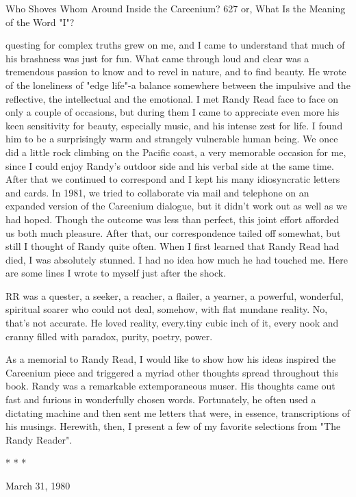 Who Shoves Whom Around Inside the Careenium?                                            627
or, What Is the Meaning of the Word "I"?

questing for complex truths grew on me, and I came to understand that much of his
brashness was just for fun. What came through loud and clear was a tremendous
passion to know and to revel in nature, and to find beauty. He wrote of the loneliness
of "edge life"-a balance somewhere between the impulsive and the reflective, the
intellectual and the emotional.
   I met Randy Read face to face on only a couple of occasions, but during them I
came to appreciate even more his keen sensitivity for beauty, especially music, and
his intense zest for life. I found him to be a surprisingly warm and strangely
vulnerable human being. We once did a little rock climbing on the Pacific coast, a
very memorable occasion for me, since I could enjoy Randy's outdoor side and his
verbal side at the same time. After that we continued to correspond and I kept his
many idiosyncratic letters and cards.
   In 1981, we tried to collaborate via mail and telephone on an expanded version of
the Careenium dialogue, but it didn't work out as well as we had hoped. Though the
outcome was less than perfect, this joint effort afforded us both much pleasure. After
that, our correspondence tailed off somewhat, but still I thought of Randy quite often.
   When I first learned that Randy Read had died, I was absolutely stunned. I had no
idea how much he had touched me. Here are some lines I wrote to myself just after
the shock.

     RR was a quester, a seeker, a reacher, a flailer, a yearner, a powerful,
  wonderful, spiritual soarer who could not deal, somehow, with flat mundane
  reality. No, that's not accurate. He loved reality, every.tiny cubic inch of it,
  every nook and cranny filled with paradox, purity, poetry, power.

   As a memorial to Randy Read, I would like to show how his ideas inspired the
Careenium piece and triggered a myriad other thoughts spread throughout this book.
Randy was a remarkable extemporaneous muser. His thoughts came out fast and
furious in wonderfully chosen words. Fortunately, he often used a dictating machine
and then sent me letters that were, in essence, transcriptions of his musings. Herewith,
then, I present a few of my favorite selections from "The Randy Reader".

                                       *   *   *

                                                                       March 31, 1980

